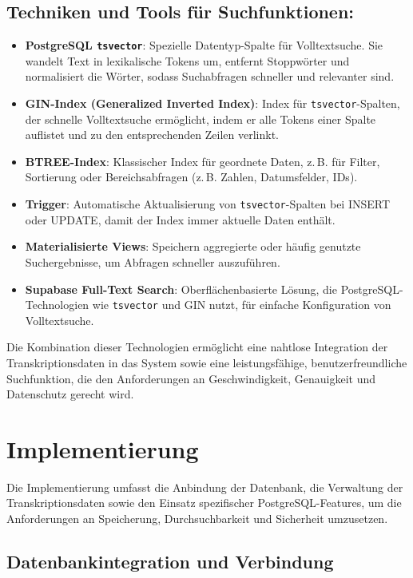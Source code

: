 \subsection{Techniken und Tools für Suchfunktionen:}
\begin{itemize}
    \item \textbf{PostgreSQL \texttt{tsvector}}: Spezielle Datentyp-Spalte für Volltextsuche. Sie wandelt Text in lexikalische Tokens um, entfernt Stoppwörter und normalisiert die Wörter, sodass Suchabfragen schneller und relevanter sind.
    \item \textbf{GIN-Index (Generalized Inverted Index)}: Index für \texttt{tsvector}-Spalten, der schnelle Volltextsuche ermöglicht, indem er alle Tokens einer Spalte auflistet und zu den entsprechenden Zeilen verlinkt.
    \item \textbf{BTREE-Index}: Klassischer Index für geordnete Daten, z.\,B. für Filter, Sortierung oder Bereichsabfragen (z.\,B. Zahlen, Datumsfelder, IDs).
    \item \textbf{Trigger}: Automatische Aktualisierung von \texttt{tsvector}-Spalten bei INSERT oder UPDATE, damit der Index immer aktuelle Daten enthält.
    \item \textbf{Materialisierte Views}: Speichern aggregierte oder häufig genutzte Suchergebnisse, um Abfragen schneller auszuführen.
    \item \textbf{Supabase Full-Text Search}: Oberflächenbasierte Lösung, die PostgreSQL-Technologien wie \texttt{tsvector} und \ac{GIN} nutzt, für einfache Konfiguration von Volltextsuche.
\end{itemize}

Die Kombination dieser Technologien ermöglicht eine nahtlose Integration der Transkriptionsdaten in das System sowie eine leistungsfähige, benutzerfreundliche Suchfunktion, die den Anforderungen an Geschwindigkeit, Genauigkeit und Datenschutz gerecht wird.

\section{Implementierung}
Die Implementierung umfasst die Anbindung der Datenbank, die Verwaltung der Transkriptionsdaten sowie den Einsatz spezifischer PostgreSQL-Features, um die Anforderungen an Speicherung, Durchsuchbarkeit und Sicherheit umzusetzen.

\subsection{Datenbankintegration und Verbindung}
\label{sec:loesung:db_integration}

